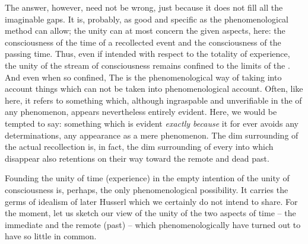 The answer, however, need not be wrong, just because it does not fill all the
imaginable gaps. It is, probably, as good and specific as the phenomenological
method can allow; the unity can at most concern the  given aspects,
here: the  consciousness of the time of a recollected event and the
consciousness of the  passing time.  Thus, even if intended with
respect to the totality of experience, the unity of the stream of consciousness
remains confined to the limits of the \hoa. And even when so confined, 
The  is the phenomenological way of taking into account
things which can not be taken into phenomenological account. Often, like here,
it refers to something which, 
although ingraspable and unverifiable in the  of any phenomenon,
appears nevertheless entirely evident. Here, we would be tempted to say:
something which is evident {\em exactly because} it for ever avoids any 
determinations, any appearance as a mere phenomenon. The dim surrounding of the
actual recollection is, in fact, the dim surrounding of every 
into which disappear also retentions on their way toward the remote and dead past. 

\pa Founding the unity of time (experience) in the empty intention of the unity
of consciousness is, perhaps, the only phenomenological possibility. It carries
the germs of idealism of later Husserl which we certainly do not intend to
share. For the moment, let us sketch our view of the unity of the two aspects of
time -- the immediate and the remote (past) -- which phenomenologically have
turned out to have so little in common.

